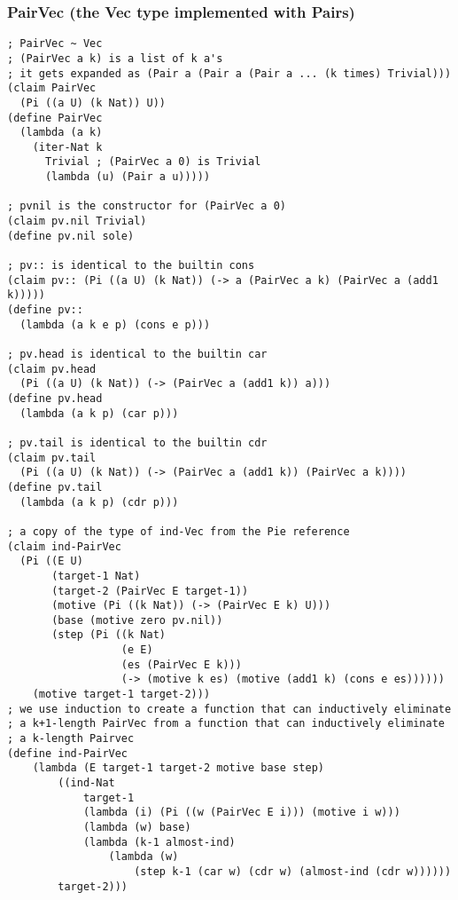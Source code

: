 \subsubsection{PairVec (the Vec type implemented with Pairs)} \label{code:PairVec}
\begin{verbatim}
; PairVec ~ Vec
; (PairVec a k) is a list of k a's
; it gets expanded as (Pair a (Pair a (Pair a ... (k times) Trivial)))
(claim PairVec
  (Pi ((a U) (k Nat)) U))
(define PairVec
  (lambda (a k)
    (iter-Nat k
      Trivial ; (PairVec a 0) is Trivial
      (lambda (u) (Pair a u)))))

; pvnil is the constructor for (PairVec a 0)
(claim pv.nil Trivial)
(define pv.nil sole)

; pv:: is identical to the builtin cons
(claim pv:: (Pi ((a U) (k Nat)) (-> a (PairVec a k) (PairVec a (add1 k)))))
(define pv::
  (lambda (a k e p) (cons e p)))

; pv.head is identical to the builtin car
(claim pv.head
  (Pi ((a U) (k Nat)) (-> (PairVec a (add1 k)) a)))
(define pv.head
  (lambda (a k p) (car p)))

; pv.tail is identical to the builtin cdr
(claim pv.tail
  (Pi ((a U) (k Nat)) (-> (PairVec a (add1 k)) (PairVec a k))))
(define pv.tail
  (lambda (a k p) (cdr p)))

; a copy of the type of ind-Vec from the Pie reference
(claim ind-PairVec
  (Pi ((E U)
       (target-1 Nat)
       (target-2 (PairVec E target-1))
       (motive (Pi ((k Nat)) (-> (PairVec E k) U)))
       (base (motive zero pv.nil))
       (step (Pi ((k Nat)
                  (e E)
                  (es (PairVec E k)))
                  (-> (motive k es) (motive (add1 k) (cons e es))))))
    (motive target-1 target-2)))
; we use induction to create a function that can inductively eliminate
; a k+1-length PairVec from a function that can inductively eliminate
; a k-length Pairvec
(define ind-PairVec
    (lambda (E target-1 target-2 motive base step)
        ((ind-Nat
            target-1
            (lambda (i) (Pi ((w (PairVec E i))) (motive i w)))
            (lambda (w) base)
            (lambda (k-1 almost-ind)
                (lambda (w)
                    (step k-1 (car w) (cdr w) (almost-ind (cdr w))))))
        target-2)))
\end{verbatim}


